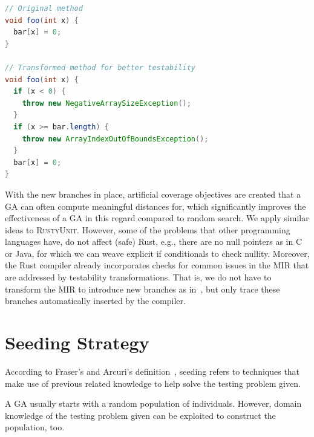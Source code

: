 \documentclass[paper=a4,%
  twoside,%
  BCOR4mm,%
  abstract=true,%
  toc=bibliography,%
  chapterprefix=true,%
  toc=bibliographynumbered,%
  open=right,%
  english,%
  pagesize=pdftex]{scrreprt}
\newcommand{\tech}{\textsc{RustyUnit}\xspace}
\newcommand{\mir}{\ac{MIR}\xspace}
\newcommand{\ga}{\ac{GA}\xspace}
\begin{document}
\begin{lstlisting}[language=Java, style=boxed, caption={Array access transformation in \textsc{EvoSuite} for Java}, label=lst:evosuite-array-access-transformation]
// Original method
void foo(int x) {
  bar[x] = 0;
}

// Transformed method for better testability
void foo(int x) {
  if (x < 0) {
    throw new NegativeArraySizeException();
  }
  if (x >= bar.length) {
    throw new ArrayIndexOutOfBoundsException();
  }
  bar[x] = 0;
}
\end{lstlisting}

With the new branches in place, artificial coverage objectives are created that a \ga can often compute meaningful distances for, which significantly improves the effectiveness of a \ga in this regard compared to random search. We apply similar ideas to \tech. However, some of the problems that other programming languages have, do not affect (safe) Rust, e.g., there are no null pointers as in C or Java, for which we can weave explicit if conditionals to check nullity. Moreover, the Rust compiler already incorporates checks for common issues in the \mir that are addressed by testability transformations. That is, we do not have to transform the \mir to introduce new branches as in~, but only trace these branches automatically inserted by the compiler. 

\section{Seeding Strategy}
\label{sec:seeding-strategy}

According to Fraser's and Arcuri's definition~\cite{6200103}, seeding refers to techniques that make use of previous related knowledge to help solve the testing problem given. 

A \ga usually starts with a random population of individuals. However, domain knowledge of the testing problem given can be exploited to construct the population, too. 

\end{document}
